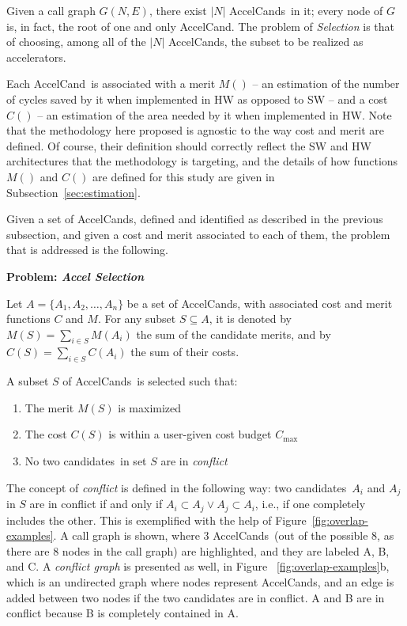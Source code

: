 \documentclass[]{usiinfthesis}
\newcommand{\candidate}{{AccelCand}}
\newcommand{\candidates}{{AccelCand}s}
\newcommand{\candidatesW}{candidates}
\newcommand{\asprobname}{\emph{Accel Selection}}
\begin{document}
Given a call graph $G(N,E)$, there exist $|N|$ \candidates\ in it;
every node of $G$ is, in fact, the root of one and only \candidate.
The problem of \emph{Selection} is that of choosing, among all of the
$|N|$ \candidates, the subset to be realized as accelerators.\par

Each \candidate\ is associated with a merit $M()$ -- an estimation of the
number of cycles saved by it when implemented in HW as opposed to SW --
and a cost $C()$ --  an estimation of the area needed by it when
implemented in HW. Note that the methodology here proposed is agnostic to
the way cost and merit are defined.
Of course, their definition should correctly reflect the SW and HW
architectures that the methodology is targeting, and the details of
how functions $M()$ and $C()$ are defined for this study 
are given in Subsection~\ref{sec:estimation}.\par

Given a set of \candidates, defined and identified as described
in the previous subsection, and given a cost and merit associated to
each of them, the problem that is addressed is the following.\par

\textbf{Problem: \asprobname}

Let $A = \{ A_1, A_2, \ldots, A_n \}$ be a set of
\candidates, with associated cost and merit functions $C$ and $M$.
For any subset $S\subseteq A$, it is denoted by $M(S) = \sum_{i\in S} M(A_i)$ the 
sum of the candidate merits, and by $C(S) = \sum_{i\in S} 
C(A_i)$ the sum of their costs.\par

A subset $S$ of \candidates\ is selected such that:
\begin{enumerate}
\item The merit $M(S)$ is maximized
\item The cost $C(S)$ is within a user-given cost budget $C_{\max}$
\item No two \candidatesW\ in set $S$ are in \emph{conflict}
\end{enumerate}

The concept of \emph{conflict} is defined in the following way: two
\candidatesW\ $A_i$ and $A_j$ in $S$ are in conflict if and only if
$A_i\subset A_j \lor A_j\subset A_i$, i.e., if one completely includes the other.
This 
is exemplified with the help of Figure~\ref{fig:overlap-examples}. A call
graph is shown, where 3 \candidates\ (out of the possible 8, as there
are 8 nodes in the call graph) are highlighted, and they are labeled
A, B, and C. A \emph{conflict graph} is presented as well, in Figure
~\ref{fig:overlap-examples}b, which is an undirected graph where nodes
represent \candidates, and an edge is added between two nodes if the
two candidates are in conflict. A and B are in conflict because B is
completely contained in A.\par
\end{document}
